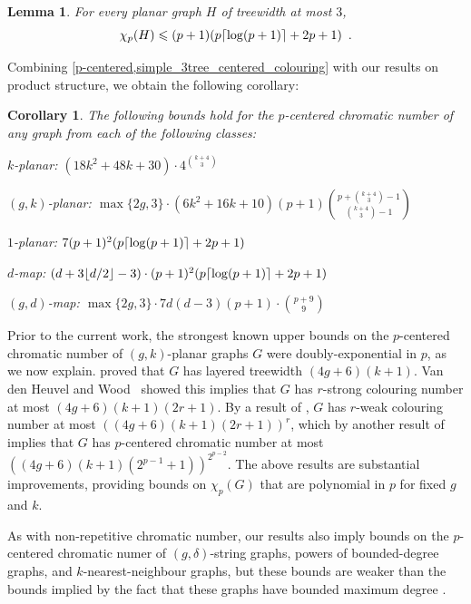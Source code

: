 \documentclass{patmorin}
\theoremstyle{plain}
\newtheorem{lem}[thm]{Lemma}
\newtheorem{cor}[thm]{Corollary}
\theoremstyle{definition}
\DeclarePairedDelimiter{\ceil}{\lceil}{\rceil}
\DeclarePairedDelimiter{\floor}{\lfloor}{\rfloor}
\renewcommand{\le}{\leqslant}
\begin{document}
\begin{lem}\cite{DFMS21}\label{simple_3tree_centered_colouring}
  For every planar graph $H$ of treewidth at most $3$,
  \[
    \chi_p(H)\le (p+1)(p\ceil{\log(p+1)}+2p+1) \enspace .
  \]
\end{lem}

Combining \cref{p-centered,simple_3tree_centered_colouring} with our results on product structure, we obtain the following corollary:

\begin{cor}\label{p_centered_cor}
  The following bounds hold for the $p$-centered chromatic number of any graph from each of the following classes:
  \begin{compactitem}
    \item $k$-planar: $(18k^2+48k+30)\cdot 4^{\binom{k+4}{3}}$
    \item $(g,k)$-planar: $\max\{2g,3\}\cdot(6k^2+16k+10)(p+1)\binom{p+\binom{k+4}{3}-1}{\binom{k+4}{3}-1}$
    \item $1$-planar: $7(p+1)^2(p\ceil{\log(p+1)}+2p+1)$
    \item $d$-map: $(d+3\floor{d/2}-3)\cdot (p+1)^2(p\ceil{\log(p+1)}+2p+1)$
    \item $(g,d)$-map: $\max\{2g,3\}\cdot 7d(d-3)(p+1)\cdot \binom{p+9}{9}$
  \end{compactitem}
\end{cor}


Prior to the current work, the strongest known upper bounds on the $p$-centered chromatic number of $(g,k)$-planar graphs $G$ were doubly-exponential in $p$, as we now explain. \citet{dujmovic.eppstein.ea:structure} proved that $G$ has layered treewidth $(4g+6)(k+1)$.
Van den Heuvel and Wood~\citep{vdHW18} showed this implies that $G$  has $r$-strong colouring number at most $(4g + 6)(k + 1)(2r + 1)$. By a result of \citet{zhu:colouring}, $G$ has $r$-weak colouring number at most $( (4g + 6)(k + 1)(2r + 1) )^r$, which by another result of  \citet{zhu:colouring} implies that $G$ has  $p$-centered chromatic number at most $( (4g+6)(k+1)(2^{p-1} + 1) )^{2^{p-2}}$. The above results are substantial improvements, providing bounds on $\chi_p(G)$ that are polynomial in $p$ for fixed $g$ and $k$.

As with non-repetitive chromatic number, our results also imply bounds on the $p$-centered chromatic numer of $(g,\delta)$-string graphs, powers of bounded-degree graphs, and $k$-nearest-neighbour graphs, but these bounds are weaker than the bounds implied by the fact that these graphs have bounded maximum degree \cite{DFMS21}.
\end{document}
